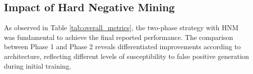 %
%
%
%

\subsection{Impact of Hard Negative Mining}

As observed in Table \ref{tab:overall_metrics}, the two-phase strategy with HNM was fundamental to achieve the final reported performance. The comparison between Phase 1 and Phase 2 reveals differentiated improvements according to architecture, reflecting different levels of susceptibility to false positive generation during initial training.


